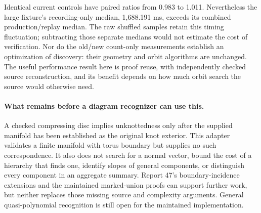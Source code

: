 Identical current controls have paired ratios from 0.983 to 1.011.
Nevertheless the large fixture's recording-only median, 1,688.191 ms,
exceeds its combined production/replay median. The raw shuffled samples
retain this timing fluctuation; subtracting those separate medians would
not estimate the cost of verification. Nor do the old/new count-only
measurements establish an optimization of discovery: their geometry and
orbit algorithms are unchanged. The useful performance result here is
proof reuse, with independently checked source reconstruction, and its
benefit depends on how much orbit search the source would otherwise need.

\paragraph{What remains before a diagram recognizer can use this.}
A checked compressing disc implies unknottedness only after the supplied
manifold has been established as the original knot exterior. This adapter
validates a finite manifold with torus boundary but supplies no such
correspondence. It also does not search for a normal vector, bound the
cost of a hierarchy that finds one, identify slopes of general components,
or distinguish every component in an aggregate summary. Report 47's
boundary-incidence extensions and the maintained marked-union proofs can
support further work, but neither replaces those missing source and
complexity arguments. General quasi-polynomial recognition is still open
for the maintained implementation.
